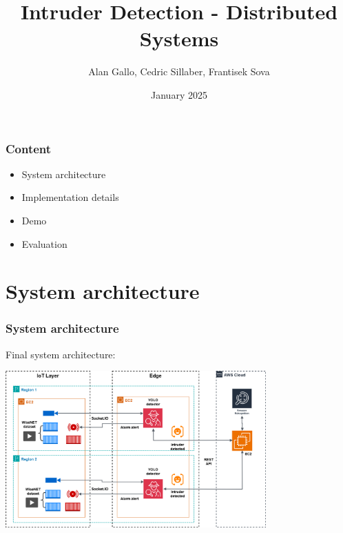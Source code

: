 \documentclass{beamer}
\title{Intruder Detection - Distributed Systems}
\author{Alan Gallo, Cedric Sillaber, Frantisek Sova}
\date{January 2025}
\begin{document}


\begin{frame}
    \frametitle{Content}
    \begin{itemize}
        \item System architecture
        \item Implementation details
        \item Demo
        \item Evaluation
    \end{itemize}
\end{frame}


\section{System architecture}


\begin{frame}
\frametitle{System architecture}
Final system architecture:


\begin{center}
    \includegraphics[width=0.75\textwidth]{./res/DS_architecture_final.png}\\
\end{center}
\end{frame}
\end{document}
